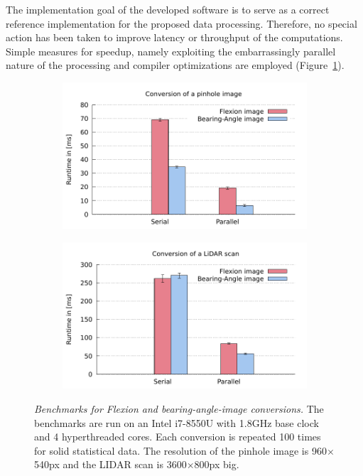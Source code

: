 The implementation goal of the developed software is to serve as a correct reference implementation for the proposed data processing.
Therefore, no special action has been taken to improve latency or throughput of the computations.
Simple measures for speedup, namely exploiting the embarrassingly parallel nature of the processing and compiler optimizations are employed (Figure~\ref{fig:benchmarks}).
\begin{figure}
\centering
    \begin{subfigure}[b]{0.45\linewidth}
        \includegraphics[width=\linewidth]{chapter06/results/benchmarks/pinhole_benchmarks.pdf}
    \end{subfigure}\quad
    \begin{subfigure}[b]{0.45\linewidth}
        \includegraphics[width=\linewidth]{chapter06/results/benchmarks/laserscan_benchmarks.pdf}
    \end{subfigure}
    \caption[Benchmarks for Flexion and \gls{bearing-angle-image} conversions]{\emph{Benchmarks for Flexion and \gls{bearing-angle-image} conversions.} The benchmarks are run on an Intel i7-8550U with 1.8GHz base clock and 4 hyperthreaded cores. Each conversion is repeated 100 times for solid statistical data. The resolution of the pinhole image is 960$\times$540px and the \acrshort{LIDAR} scan is 3600$\times$800px big.}\label{fig:benchmarks}
\end{figure}
